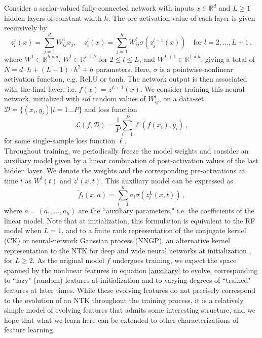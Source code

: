 \documentclass[a4paper, 11pt]{article}
\begin{document}
Consider a scalar-valued fully-connected network with inputs $x\in \mathbb R^d$ and $L \geq  1$ hidden layers of constant width $h$. The pre-activation value of each layer is given recursively by
\begin{equation}
    z^1_i(x) = \sum_{j=1}^d W^1_{ij}x_j, \quad
    z^l_i(x) = \sum_{j=1}^h W^l_{ij}\sigma(z^{l-1}_j(x)) \quad \text{for } l = 2,\ldots, L+1 \,,
\end{equation}
where $W^1 \in \mathbb R^{h\times d}$, $W^l \in \mathbb R^{h\times h}$ for $2\leq l \leq L$, and $W^{L+1} \in \mathbb R^{1 \times h}$, giving a total of $N = d\cdot h + (L-1)\cdot h^2 + h$ parameters. Here, $\sigma$ is a pointwise-nonlinear activation function, e.g. ReLU or tanh. The network output is then associated with the final layer, i.e. $f(x) = z^{L+1}(x)$. We consider training this neural network, initialized with $iid$ random values of $W^l_{ij}$, on a data-set $\mathcal D = \{(x_i, y_i) | i = 1\ldots P\}$ and loss function
\begin{equation}
    \mathcal L (f, \mathcal D) = \frac{1}{P}\sum_{i=1}^P \ell (f(x_i), y_i)\,,
    \label{loss_function}
\end{equation}
for some single-sample loss function $\ell$.\\

Throughout training, we periodically freeze the model weights and consider an auxiliary model given by a linear combination of post-activation values of the last hidden layer. We denote the weights and the corresponding pre-activations at time $t$ as $W^l(t)$ and $z^l(x, t)$. This auxiliary model can be expressed as
\begin{equation}
    \tilde f_t(x, a) = \sum_{i=1}^h a_i \sigma(z^L_i(x, t))\,,
    \label{auxiliary}
\end{equation}
where $a = (a_1, \ldots, a_h)$ are the ``auxiliary parameters," i.e. the coefficients of the linear model. Note that at initialization, this formulation is equivalent to the RF model when $L=1$, and to a finite rank representation of the conjugate kernel (CK) or neural-network Gaussian process (NNGP), an alternative kernel representation to the NTK for deep and wide neural networks at initialization \cite{danielyDeeperUnderstandingNeural2017,leeDeepNeuralNetworks2018}, for $L\geq 2$. As the original model $f$ undergoes training, we expect the space spanned by the nonlinear features in equation \eqref{auxiliary} to evolve, corresponding to ``lazy" (random) features at initialization and to varying degrees of ``trained" features at later times. While these evolving features do not precisely correspond to the evolution of an NTK throughout the training process, it is a relatively simple model of evolving features that admits some interesting structure, and we hope that what we learn here can be extended to other characterizations of feature learning.\\
\end{document}
